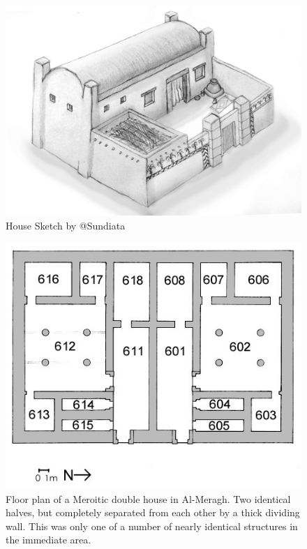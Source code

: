 \documentclass[a4paper,12pt]{scrreprt}
\begin{document}
\begin{figure}[H]
	\centering
	\includegraphics[width=\textwidth]{img/house/sundiata_house_sketch}
	\caption{House Sketch by @Sundiata}\label{fig:house_sketch}
\end{figure}

\begin{figure}[H]
	\centering
	\includegraphics[width=\textwidth]{img/house/meroitic_double_house_floor_plan}
	\caption{Floor plan of a Meroitic double house in Al-Meragh. Two identical halves, but completely separated from each other by a thick dividing wall. This was only one of a number of nearly identical structures in the immediate area.}
\end{figure}
\end{document}
